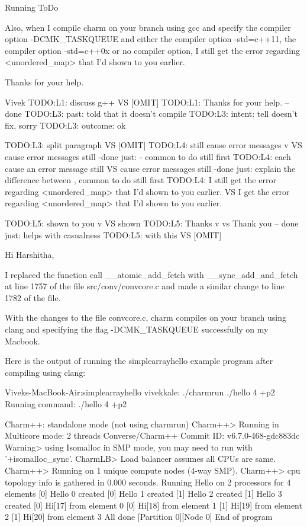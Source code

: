\documentclass[serif, mathserif, final]{beamer}
\begin{document}
\begin{frame}
\begin{columns}
\begin{column}{0.5\linewidth}
\begin{block}{Running ToDo}
\begin{enumerate}
{      
      Also, when I compile charm on your branch using gcc and specify the
      compiler option -DCMK_TASKQUEUE and either the compiler option
      -std=c++11, the compiler option -std=c++0x or no compiler option, I
      still get the error regarding <unordered_map> that I'd shown to you
      earlier.
      
      Thanks for your help.
      
      Vivek
      TODO:L1: discuss g++ VS [OMIT] 
      TODO:L1: Thanks for your help. –done 
      TODO:L3: past: told that it doesn't compile
      TODO:L3: intent: tell doesn't fix, sorry
      TODO:L3: outcome: ok
      
      TODO:L3: split paragraph VS [OMIT] 
      TODO:L4: still cause error messages v VS cause error messages still
      -done just: -  common to do still first 
      TODO:L4: each cause an error message still  VS cause error messages
      still  -done just: explain the difference between , common to do still
      first 
      TODO:L4: I still get the error regarding <unordered_map> that I'd
      shown to you earlier. VS I get the error regarding <unordered_map>
      that I'd shown to you earlier.
      
      TODO:L5: shown to you v VS shown 
      TODO:L5: Thanks v vs Thank you – done just: helps with casualness 
      TODO:L5: with this VS [OMIT] 

      Hi Harshitha,
      
      I replaced the function call __atomic_add_fetch with
      __sync_add_and_fetch at line 1757 of the file src/conv/convcore.c and
      made a similar change to line 1782 of the file.
      
      With the changes to the file convcore.c, charm compiles on your branch
      using clang and specifying the flag -DCMK_TASKQUEUE successfully on my
      Macbook.
      
      Here is the output of running the simplearrayhello example program
      after compiling using clang:
      
      Viveks-MacBook-Air:simplearrayhello vivekkale: ./charmrun ./hello 4
      +p2
      Running command: ./hello 4 +p2
      
      Charm++: standalone mode (not using charmrun)
      Charm++> Running in Multicore mode:  2 threads
      Converse/Charm++ Commit ID: v6.7.0-468-gdc883dc
      Warning> using Isomalloc in SMP mode, you may need to run with
      '+isomalloc_sync'.
      CharmLB> Load balancer assumes all CPUs are same.
      Charm++> Running on 1 unique compute nodes (4-way SMP).
      Charm++> cpu topology info is gathered in 0.000 seconds.
      Running Hello on 2 processors for 4 elements
      [0] Hello 0 created
      [0] Hello 1 created
      [1] Hello 2 created
      [1] Hello 3 created
      [0] Hi[17] from element 0
      [0] Hi[18] from element 1
      [1] Hi[19] from element 2
      [1] Hi[20] from element 3
      All done
      [Partition 0][Node 0] End of program

}
\end{enumerate}
\end{block}
\end{column}
\end{columns}
\end{frame}
\end{document}

